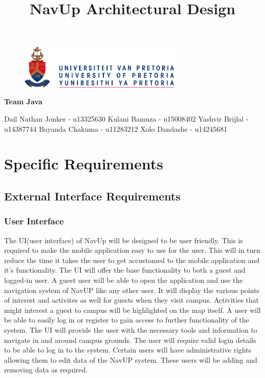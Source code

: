 \documentclass{article}
\begin{document}
\begin{figure}[t]
			\centering
			\includegraphics[width=300px]{UP_Logo.jpg}
\end{figure}
\title{NavUp Architectural Design}
\maketitle
		\begin{center}
			\textbf{\newline Team Java} \\
		\end{center}
		
		\begin{flushright} \large
			Dail Nathan Jonker - u13325630 \newline
			Kulani Bamuza - u15008402 \newline
			Yashvir Brijlal - u14387744 \newline
			Bayanda Chakuma - u11283212 \newline
			Xolo Dandashe - u14245681 \newline     
		\end{flushright}
\clearpage
\tableofcontents
	
\clearpage
\section{Specific Requirements}
	\subsection{External Interface Requirements}
		\subsubsection{User Interface}
The UI(user interface) of NavUp will be designed to be user friendly. This is required to make the mobile application easy to use for the user. This will in turn reduce the time it takes the user to get accustomed to the mobile application and it's functionality. The UI will offer the base functionality to both a guest and logged-in user. A guest user will be able to open the application and use the navigation system of NavUP like any other user. It will display the various points of interest and activites as well for guests when they visit campus. Activities that might interest a guest to campus will be highlighted on the map itself. A user will be able to easily log in or register to gain access to further functionality of the system. The UI will provide the user with the necessary tools and information to navigate in and around campus grounds. The user will require valid login details to be able to log in to the system. Certain users will have administrative rights allowing them to edit data of the NavUP system. These users will be adding and removing data as required.
\end{document}
